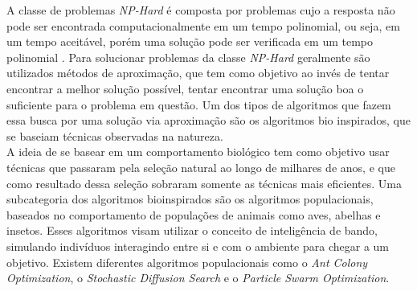 \indent A classe de problemas \textit{NP-Hard} é composta por problemas cujo a resposta não pode ser encontrada computacionalmente em um tempo polinomial, ou seja, em um tempo aceitável, porém uma solução pode ser verificada em um tempo polinomial \cite{Eswaramurthy2008}.
Para solucionar problemas da classe \textit{NP-Hard} geralmente são utilizados métodos de aproximação, que tem como objetivo ao invés de tentar encontrar a melhor solução possível, tentar encontrar uma solução boa o suficiente para o problema em questão.
Um dos tipos de algoritmos que fazem essa busca por uma solução via aproximação são os algoritmos bio inspirados, que se baseiam técnicas observadas na natureza.\\
\indent A ideia de se basear em um comportamento biológico tem como objetivo usar técnicas que passaram pela seleção natural ao longo de milhares de anos, e que como resultado dessa seleção sobraram somente as técnicas mais eficientes.
Uma subcategoria dos algoritmos bioinspirados são os algoritmos populacionais, baseados no comportamento de populações de animais como aves, abelhas e insetos.
Esses algoritmos visam utilizar o conceito de inteligência de bando, simulando indivíduos interagindo entre si e com o ambiente para chegar a um objetivo.
Existem diferentes algoritmos populacionais como o \textit{Ant Colony Optimization}, o \textit{Stochastic Diffusion Search} e o \textit{Particle Swarm Optimization}.
